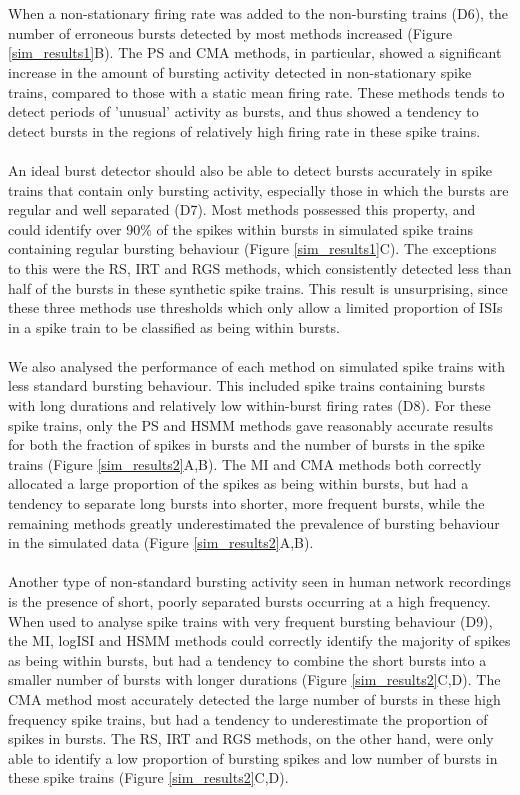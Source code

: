 \documentclass[12pt, titlepage]{article}
\begin{document}
	\\ \\ When a non-stationary firing rate was added to the non-bursting trains (D6), the number of erroneous bursts detected by most methods increased (Figure \ref{sim_results1}B). The PS and CMA methods, in particular, showed a significant increase in the amount of bursting activity detected in non-stationary spike trains, compared to those with a static mean firing rate. These methods tends to detect periods of 'unusual' activity as bursts, and thus showed a tendency to detect bursts in the regions of relatively high firing rate in these spike trains. 
	\\ \\ An ideal burst detector should also be able to detect bursts accurately in spike trains that contain only bursting activity, especially those in which the bursts are regular and well separated (D7). Most methods possessed this property, and could identify over 90\% of the spikes within bursts in simulated spike trains containing regular bursting behaviour (Figure \ref{sim_results1}C). The exceptions to this were the RS, IRT and RGS methods, which consistently detected less than half of the bursts in these synthetic spike trains. This result is unsurprising, since these three methods use thresholds which only allow a limited proportion of ISIs in a spike train to be classified as being within bursts.
	\\ \\ We also analysed the performance of each method on simulated spike trains with less standard bursting behaviour. This included  spike trains containing bursts with long durations and relatively low within-burst firing rates (D8). For these spike trains, only the PS and HSMM methods gave reasonably accurate results for both the fraction of spikes in bursts and the number of bursts in the spike trains (Figure \ref{sim_results2}A,B). The MI and CMA methods both correctly allocated a large proportion of the spikes as being within bursts, but had a tendency to separate long bursts into shorter, more frequent bursts, while the remaining methods greatly underestimated the prevalence of bursting behaviour in the simulated data (Figure \ref{sim_results2}A,B).
	\\ \\ Another type of non-standard bursting activity seen in human network recordings is the presence of short, poorly separated bursts occurring at a high frequency. When used to analyse spike trains with very frequent bursting behaviour (D9), the MI, logISI and HSMM methods could correctly identify the majority of spikes as being within bursts, but had a tendency to combine the short bursts into a smaller number of bursts with longer durations (Figure \ref{sim_results2}C,D). The CMA method most accurately detected the large number of bursts in these high frequency spike trains, but had a tendency to underestimate the proportion of spikes in bursts. The RS, IRT and RGS methods, on the other hand, were only able to identify a low proportion of bursting spikes and low number of bursts in these spike trains (Figure \ref{sim_results2}C,D).
\end{document}
